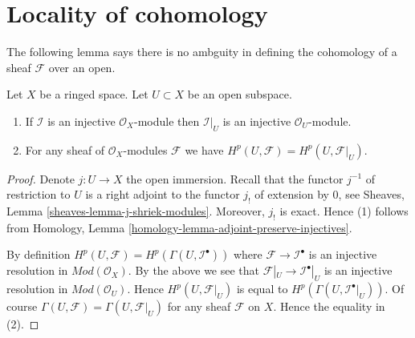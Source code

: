 \section{Locality of cohomology}
\label{section-locality}

\noindent
The following lemma says there is no ambguity in defining the cohomology
of a sheaf $\mathcal{F}$ over an open.

\begin{lemma}
\label{lemma-cohomology-of-open}
Let $X$ be a ringed space.
Let $U \subset X$ be an open subspace.
\begin{enumerate}
\item If $\mathcal{I}$ is an injective $\mathcal{O}_X$-module
then $\mathcal{I}|_U$ is an injective $\mathcal{O}_U$-module.
\item For any sheaf of $\mathcal{O}_X$-modules $\mathcal{F}$ we have
$H^p(U, \mathcal{F}) = H^p(U, \mathcal{F}|_U)$.
\end{enumerate}
\end{lemma}

\begin{proof}
Denote $j : U \to X$ the open immersion.
Recall that the functor $j^{-1}$ of restriction to $U$ is a right adjoint
to the functor $j_!$ of extension by $0$, see
Sheaves, Lemma \ref{sheaves-lemma-j-shriek-modules}.
Moreover, $j_!$ is exact. Hence (1) follows from
Homology, Lemma \ref{homology-lemma-adjoint-preserve-injectives}.

\medskip\noindent
By definition $H^p(U, \mathcal{F}) = H^p(\Gamma(U, \mathcal{I}^\bullet))$
where $\mathcal{F} \to \mathcal{I}^\bullet$ is an injective resolution
in $\textit{Mod}(\mathcal{O}_X)$.
By the above we see that $\mathcal{F}|_U \to \mathcal{I}^\bullet|_U$
is an injective resolution in $\textit{Mod}(\mathcal{O}_U)$.
Hence $H^p(U, \mathcal{F}|_U)$ is equal to
$H^p(\Gamma(U, \mathcal{I}^\bullet|_U))$.
Of course $\Gamma(U, \mathcal{F}) = \Gamma(U, \mathcal{F}|_U)$ for
any sheaf $\mathcal{F}$ on $X$.
Hence the equality
in (2).
\end{proof}

